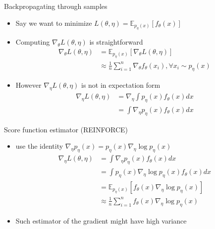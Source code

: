 \documentclass[compress]{beamer}
\newcommand{\expects}[2]{\mathbb{E}_{#1} \left[ #2 \right]}
\begin{document}
\begin{frame}[allowframebreaks]{Backpropagating through samples}
    \begin{itemize}
        \item Say we want to minimize $L(\theta, \eta) = \expects{p_{\eta}(x)}{f_{\theta}(x)}$
        \item Computing $\nabla_{\theta} L(\theta, \eta)$ is straightforward
            \begin{align*}
                \nabla_{\theta} L(\theta, \eta) & = \expects{p_\eta(x)}{\nabla_{\theta} L(\theta, \eta)} \\
                                                & \approx \frac{1}{n} \sum_{i=1}^n \nabla_\theta f_{\theta}(x_i), \forall x_i\sim p_{\eta}(x)
            \end{align*}
        \item However $\nabla_\eta L(\theta, \eta)$ is not in expectation form
            \begin{align*}
                \nabla_\eta L(\theta, \eta) & = \nabla_\eta \int p_\eta(x) f_\theta(x) dx \\
                                            & =  \int \nabla_\eta p_\eta(x) f_\theta(x) dx 
            \end{align*}
    \end{itemize}
    \framebreak
    \begin{block}{Score function estimator (REINFORCE)}
        \begin{itemize}
            \item  use the identity $\nabla_\eta p_\eta(x) = p_\eta(x) \nabla_\eta \log p_{\eta}(x)$
                \begin{align*}
                    \nabla_{\eta} L(\theta, \eta) & = \int \nabla_\eta p_\eta(x) f_\theta(x) dx \\
                                                  & = \int p_\eta(x)\nabla_\eta \log p_\eta(x) f_\theta(x) dx \\ 
                                                  & = \expects{p_\eta(x)}{f_\theta(x)\nabla_\eta \log p_\eta(x)} \\
                                                  & \approx \frac{1}{n} \sum_{i=1}^n f_\theta(x)\nabla_\eta \log p_\eta(x)
                \end{align*}
            \item Such estimator of the gradient might have high variance
        \end{itemize}
    \end{block}

\end{frame}
\end{document}
